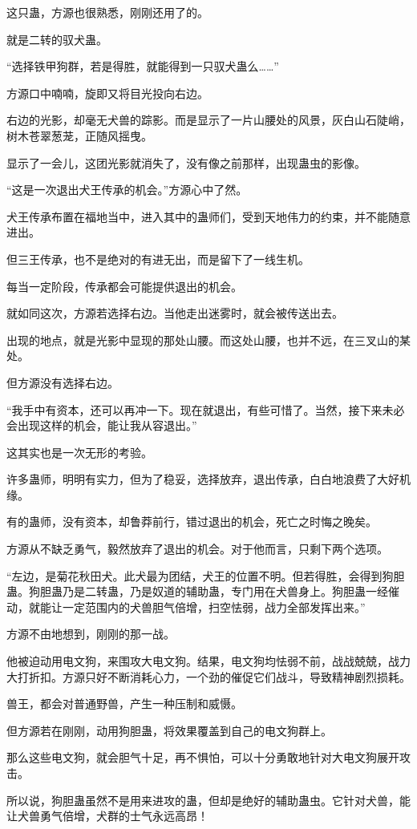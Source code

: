 \begin{this_body}
这只蛊，方源也很熟悉，刚刚还用了的。

就是二转的驭犬蛊。

“选择铁甲狗群，若是得胜，就能得到一只驭犬蛊么……”

方源口中喃喃，旋即又将目光投向右边。

右边的光影，却毫无犬兽的踪影。而是显示了一片山腰处的风景，灰白山石陡峭，树木苍翠葱茏，正随风摇曳。

显示了一会儿，这团光影就消失了，没有像之前那样，出现蛊虫的影像。

“这是一次退出犬王传承的机会。”方源心中了然。

犬王传承布置在福地当中，进入其中的蛊师们，受到天地伟力的约束，并不能随意进出。

但三王传承，也不是绝对的有进无出，而是留下了一线生机。

每当一定阶段，传承都会可能提供退出的机会。

就如同这次，方源若选择右边。当他走出迷雾时，就会被传送出去。

出现的地点，就是光影中显现的那处山腰。而这处山腰，也并不远，在三叉山的某处。

但方源没有选择右边。

“我手中有资本，还可以再冲一下。现在就退出，有些可惜了。当然，接下来未必会出现这样的机会，能让我从容退出。”

这其实也是一次无形的考验。

许多蛊师，明明有实力，但为了稳妥，选择放弃，退出传承，白白地浪费了大好机缘。

有的蛊师，没有资本，却鲁莽前行，错过退出的机会，死亡之时悔之晚矣。

方源从不缺乏勇气，毅然放弃了退出的机会。对于他而言，只剩下两个选项。

“左边，是菊花秋田犬。此犬最为团结，犬王的位置不明。但若得胜，会得到狗胆蛊。狗胆蛊乃是二转蛊，乃是奴道的辅助蛊，专门用在犬兽身上。狗胆蛊一经催动，就能让一定范围内的犬兽胆气倍增，扫空怯弱，战力全部发挥出来。”

方源不由地想到，刚刚的那一战。

他被迫动用电文狗，来围攻大电文狗。结果，电文狗均怯弱不前，战战兢兢，战力大打折扣。方源只好不断消耗心力，一个劲的催促它们战斗，导致精神剧烈损耗。

兽王，都会对普通野兽，产生一种压制和威慑。

但方源若在刚刚，动用狗胆蛊，将效果覆盖到自己的电文狗群上。

那么这些电文狗，就会胆气十足，再不惧怕，可以十分勇敢地针对大电文狗展开攻击。

所以说，狗胆蛊虽然不是用来进攻的蛊，但却是绝好的辅助蛊虫。它针对犬兽，能让犬兽勇气倍增，犬群的士气永远高昂！


\end{this_body}
